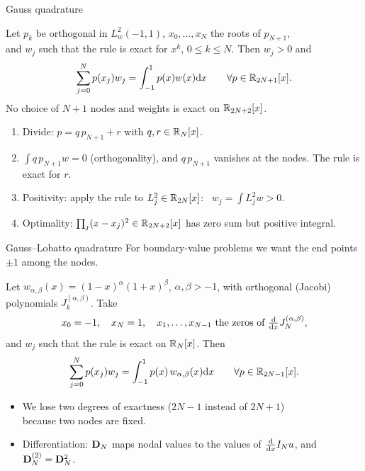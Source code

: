 \begin{frame}{Gauss quadrature}
    \small
    \begin{theorem}
        Let $p_k$ be orthogonal in $L^2_w(-1,1)$, $x_0, \dots, x_N$ the roots of $p_{N+1}$,\\ and $w_j$ such that the rule is exact for $x^k$, $0 \le k \le N$. Then $w_j > 0$ and
        \[
            \sum_{j=0}^N p(x_j) w_j = \int_{-1}^1 p(x) w(x) {\mathrm d} x \qquad \forall p \in {\mathbb R}_{2N+1}[x].
        \]
        No choice of $N+1$ nodes and weights is exact on ${\mathbb R}_{2N+2}[x]$.
    \end{theorem}
    \begin{proofsteps}
        \begin{enumerate}
            \item Divide: $p = q\, p_{N+1} + r$ with $q, r \in {\mathbb R}_N[x]$.
            \item $\int q\, p_{N+1} w = 0$ (orthogonality), and $q\,p_{N+1}$ vanishes at the nodes. The rule is exact for $r$.
            \item Positivity: apply the rule to $L_j^2 \in {\mathbb R}_{2N}[x]$: \ $w_j = \int L_j^2 w > 0$.
            \item Optimality: $\prod_j (x - x_j)^2 \in {\mathbb R}_{2N+2}[x]$ has zero sum but positive integral.
        \end{enumerate}
    \end{proofsteps}
\end{frame}

\begin{frame}{Gauss--Lobatto quadrature}
    For boundary-value problems we want the end points $\pm1$ among the nodes.
    \begin{theorem}
        Let $w_{\alpha,\beta}(x) = (1-x)^\alpha(1+x)^\beta$, $\alpha, \beta > -1$, with orthogonal (Jacobi) polynomials $J_k^{(\alpha,\beta)}$. Take
        \[
            x_0 = -1, \quad x_N = 1, \quad x_1, \dots, x_{N-1} \text{ the zeros of } \tfrac{{\mathrm d}}{{\mathrm d} x} J_N^{(\alpha,\beta)},
        \]
        and $w_j$ such that the rule is exact on ${\mathbb R}_N[x]$. Then
        \[
            \sum_{j=0}^N p(x_j) w_j = \int_{-1}^1 p(x)\, w_{\alpha,\beta}(x) {\mathrm d} x \qquad \forall p \in {\mathbb R}_{2N-1}[x].
        \]
    \end{theorem}
    \vspace{-1pt}%
    \begin{itemize}
        \item We lose two degrees of exactness ($2N-1$ instead of $2N+1$)\\ because two nodes are fixed.
        \item Differentiation: $\mathbf{D}_N$ maps nodal values to the values of $\frac{{\mathrm d}}{{\mathrm d} x} I_N u$, and $\mathbf{D}_N^{(2)} = \mathbf{D}_N^2$.
    \end{itemize}
\end{frame}


